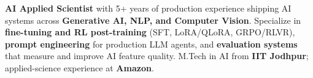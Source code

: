 \documentclass[letter,10pt]{article}
\begin{document}

\textbf{AI Applied Scientist} with 5+ years of production experience shipping AI systems across \textbf{Generative AI, NLP, and Computer Vision}.
Specialize in \textbf{fine-tuning and RL post-training} (SFT, LoRA/QLoRA, GRPO/RLVR), \textbf{prompt engineering} for production LLM agents, and \textbf{evaluation systems} that measure and improve AI feature quality.
M.Tech in AI from \textbf{IIT Jodhpur}; applied-science experience at \textbf{Amazon}.
\end{document}
